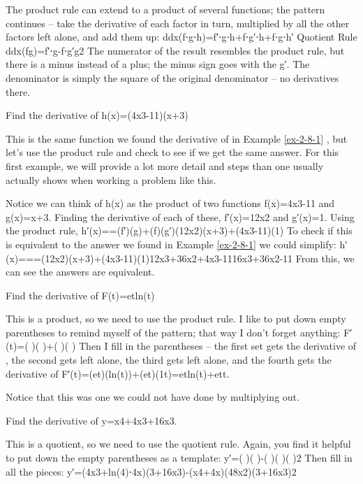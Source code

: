 \begin{example}
The product rule can extend to a product of several functions; the pattern continues – take the derivative of each factor in turn, multiplied by all the other factors left alone, and add them up:
ddx(f⋅g⋅h)=f′⋅g⋅h+f⋅g′⋅h+f⋅g⋅h′
Quotient Rule
ddx(fg)=f′⋅g-f⋅g′g2
The numerator of the result resembles the product rule, but there is a minus instead of a plus; the minus sign goes with the g′. The denominator is simply the square of the original denominator – no derivatives there.

\begin{example}
Find the derivative of h(x)=(4x3-11)(x+3)

\begin{solution} This is the same function we found the derivative of in Example \ref{ex-2-8-1} , but let's use the product rule and check to see if we get the same answer. For this first example, we will provide a lot more detail and steps than one usually actually shows when working a problem like this.

Notice we can think of h(x) as the product of two functions f(x)=4x3-11 and g(x)=x+3. Finding the derivative of each of these,
f′(x)=12x2 and g′(x)=1.
Using the product rule,
h′(x)==(f′)(g)+(f)(g′)(12x2)(x+3)+(4x3-11)(1)
To check if this is equivalent to the answer we found in Example \ref{ex-2-8-1}  we could simplify:
h′(x)===(12x2)(x+3)+(4x3-11)(1)12x3+36x2+4x3-1116x3+36x2-11
From this, we can see the answers are equivalent.
\end{solution}\end{example}

\begin{example}
Find the derivative of F(t)=etln(t)
\begin{solution} This is a product, so we need to use the product rule. I like to put down empty parentheses to remind myself of the pattern; that way I don’t forget anything:
F′(t)=( )( )+( )( )
Then I fill in the parentheses – the first set gets the derivative of , the second gets left alone, the third gets left alone, and the fourth gets the derivative of
F′(t)=(et)(ln(t))+(et)(1t)=etln(t)+ett.
\end{solution}\end{example}

Notice that this was one we could not have done by multiplying out.

\begin{example}
Find the derivative of y=x4+4x3+16x3.

\begin{solution} This is a quotient, so we need to use the quotient rule. Again, you find it helpful to put down the empty parentheses as a template:
y′=( )( )-( )( )( )2
Then fill in all the pieces:
y′=(4x3+ln(4)⋅4x)(3+16x3)-(x4+4x)(48x2)(3+16x3)2
\end{solution}\end{example}


\end{example}
